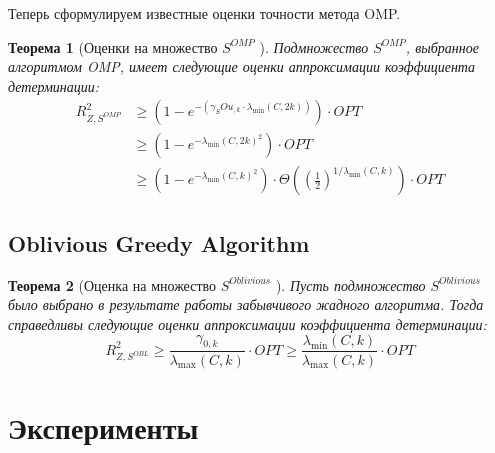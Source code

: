 \documentclass[preprint,12pt]{elsarticle}
\newtheorem{theorem}{Теорема}
\begin{document}
Теперь сформулируем известные оценки точности метода OMP.

\begin{theorem}[Оценки на множество $S^{OMP}$ \cite{das2011submodular}]
\label{t2}
Подмножество $S^{OMP}$, выбранное алгоритмом OMP, имеет следующие оценки аппроксимации коэффициента детерминации:
\begin{equation}\begin{aligned}
R_{Z, S^{OMP}}^{2} & \geq\left(1-e^{-\left(\gamma_{S} O u_{, k} \cdot \lambda_{\min }(C, 2 k)\right)}\right) \cdot OPT \\
& \geq\left(1-e^{-\lambda_{\min }(C, 2 k)^{2}}\right) \cdot OPT \\
& \geq\left(1-e^{-\lambda_{\min }(C, k)^{2}}\right) \cdot \Theta\left(\left(\frac{1}{2}\right)^{1 / \lambda_{\min }(C, k)}\right) \cdot OPT
\end{aligned}\end{equation}

\end{theorem}

\subsection{Oblivious Greedy Algorithm}
\begin{theorem}[Оценка на множество $S^{Oblivious}$ \cite{das2011submodular}]
\label{t3}
Пусть подмножество $S^{Oblivious}$ было выбрано в результате работы забывчивого жадного алгоритма. Тогда справедливы следующие оценки аппроксимации коэффициента детерминации:
\begin{equation}R_{Z, S^{O B L}}^{2} \geq \frac{\gamma_{0, k}}{\lambda_{\max }(C, k)} \cdot O P T \geq \frac{\lambda_{\min }(C, k)}{\lambda_{\max }(C, k)} \cdot O P T\end{equation}
\end{theorem}


\section{Эксперименты}
\label{S:4}
\end{document}

